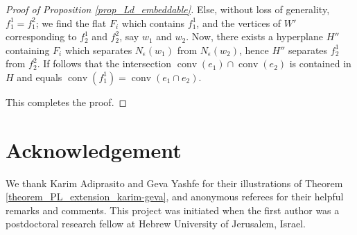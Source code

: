 \documentclass{article}
\theoremstyle{definition}
\DeclareMathOperator{\conv}{conv}
\begin{document}
\begin{proof}[Proof of Proposition \ref{prop_Ld_embeddable}]
Else, without loss of generality, $f_1^1=f_1^2$; we find the flat $F_i$ which contains $f_1^1$, and the vertices of $W'$ corresponding to $f_2^1$ and $f_2^2$, say $w_1$ and $w_2$. 
Now, there exists a hyperplane $H''$ containing $F_i$ which separates $N_\epsilon(w_1)$ from $N_\epsilon(w_2)$, hence $H''$ separates $f_2^1$ from $f_2^2$. If follows that   
the intersection $\conv(e_1)\cap \conv(e_2)$ is contained in $H$ and equals $\conv(f_1^1)=\conv(e_1\cap e_2)$. 
 
This completes the proof.
\end{proof}

\section*{Acknowledgement}
We thank Karim Adiprasito and Geva Yashfe for their illustrations of Theorem \ref{theorem_PL_extension_karim-geva}, and anonymous referees for their helpful remarks and comments. This project was initiated when the first author was a postdoctoral research fellow at Hebrew University of Jerusalem, Israel.
	



	
	
\end{document}
